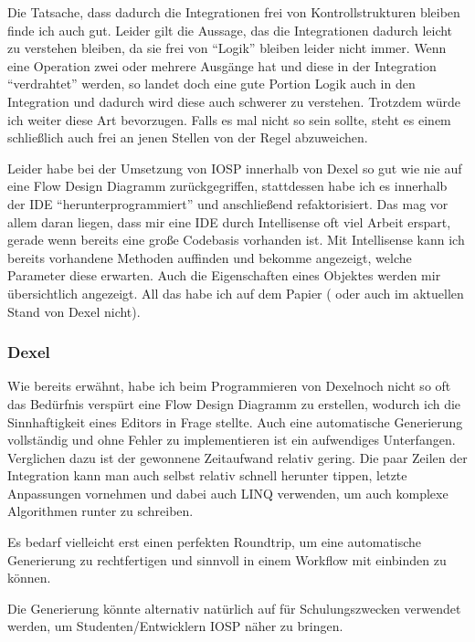 Die Tatsache, dass dadurch die Integrationen frei von Kontrollstrukturen bleiben finde ich auch gut. 
Leider gilt die Aussage, das die Integrationen dadurch leicht zu verstehen bleiben, da sie frei von \enquote{Logik} bleiben leider nicht immer. Wenn eine Operation zwei oder mehrere Ausgänge hat und diese in der Integration \enquote{verdrahtet} werden, so landet doch eine gute Portion Logik auch in den Integration und dadurch wird diese auch schwerer zu verstehen. 
Trotzdem würde ich weiter diese Art bevorzugen. Falls es mal nicht so sein sollte, steht es einem schließlich auch frei an jenen Stellen von der Regel abzuweichen.


Leider habe bei der Umsetzung von IOSP innerhalb von Dexel so gut wie nie auf eine Flow Design Diagramm zurückgegriffen, stattdessen habe ich es innerhalb der IDE \enquote{herunterprogrammiert} und anschließend refaktorisiert. Das mag vor allem daran liegen, dass mir eine IDE durch Intellisense oft viel Arbeit erspart, gerade wenn bereits eine große Codebasis vorhanden ist.
Mit Intellisense kann ich bereits vorhandene Methoden auffinden und bekomme angezeigt, welche Parameter diese erwarten.
Auch die Eigenschaften eines Objektes werden mir übersichtlich angezeigt.
All das habe ich auf dem Papier ( oder auch im aktuellen Stand von Dexel nicht).



\subsubsection{Dexel}

Wie bereits erwähnt, habe ich beim Programmieren von Dexelnoch nicht so oft das Bedürfnis verspürt eine Flow Design Diagramm zu erstellen, wodurch ich die Sinnhaftigkeit eines Editors in Frage stellte.
Auch eine automatische Generierung  vollständig und ohne Fehler zu implementieren ist ein aufwendiges Unterfangen. Verglichen dazu ist der gewonnene Zeitaufwand  relativ gering. Die paar Zeilen der Integration kann man auch selbst relativ schnell herunter tippen, letzte Anpassungen vornehmen und dabei  auch LINQ  verwenden, um  auch komplexe Algorithmen runter zu schreiben.

 Es bedarf vielleicht erst einen perfekten Roundtrip, um eine automatische Generierung zu rechtfertigen und sinnvoll in einem Workflow mit einbinden zu können.
 
 Die Generierung könnte alternativ natürlich auf für Schulungszwecken verwendet werden, um Studenten/Entwicklern IOSP näher zu bringen.
 
